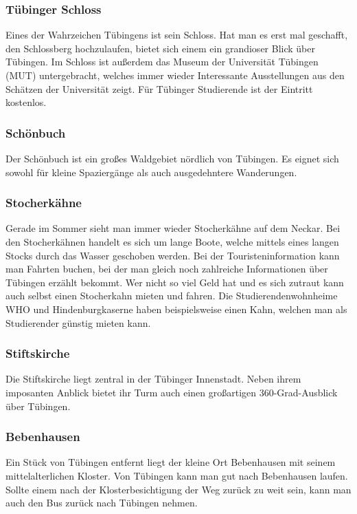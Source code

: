 \subsubsection*{Tübinger Schloss}
Eines der Wahrzeichen Tübingens ist sein Schloss. Hat man es erst mal geschafft, den Schlossberg hochzulaufen, bietet sich einem ein grandioser Blick über Tübingen. Im Schloss ist außerdem das Museum der Universität Tübingen (MUT) untergebracht, welches immer wieder Interessante Ausstellungen aus den Schätzen der Universität zeigt. Für Tübinger Studierende ist der Eintritt kostenlos.

\subsubsection*{Schönbuch}
Der Schönbuch ist ein großes Waldgebiet nördlich von Tübingen. Es eignet sich sowohl für kleine Spaziergänge als auch ausgedehntere Wanderungen.

\subsubsection*{Stocherkähne}
Gerade im Sommer sieht man immer wieder Stocherkähne auf dem Neckar. Bei den Stocherkähnen handelt es sich um lange Boote, welche mittels eines langen Stocks durch das Wasser geschoben werden. Bei der Touristeninformation kann man Fahrten buchen, bei der man gleich noch zahlreiche Informationen über Tübingen erzählt bekommt. Wer nicht so viel Geld hat und es sich zutraut kann auch selbst einen Stocherkahn mieten und fahren. Die Studierendenwohnheime WHO und Hindenburgkaserne haben beispielsweise einen Kahn, welchen man als Studierender günstig mieten kann.

\subsubsection*{Stiftskirche}
Die Stiftskirche liegt zentral in der Tübinger Innenstadt. Neben ihrem imposanten Anblick bietet ihr Turm auch einen großartigen 360-Grad-Ausblick über Tübingen. 

\subsubsection*{Bebenhausen}
Ein Stück von Tübingen entfernt liegt der kleine Ort Bebenhausen mit seinem mittelalterlichen Kloster. Von Tübingen kann man gut nach Bebenhausen laufen. Sollte einem nach der Klosterbesichtigung der Weg zurück zu weit sein, kann man auch den Bus zurück nach Tübingen nehmen.

